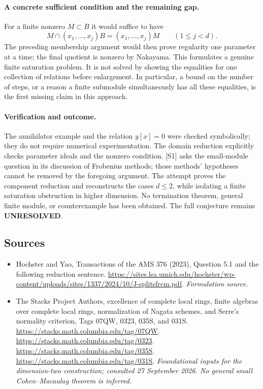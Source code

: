 \documentclass[11pt]{article}
\begin{document}
\paragraph{A concrete sufficient condition and the remaining gap.}
For a finite nonzero $M\subset B$ it would suffice to have
\[
 M\cap(x_1,\ldots,x_j)B=(x_1,\ldots,x_j)M
 \qquad(1\le j<d).
\]
The preceding membership argument would then prove regularity one
parameter at a time; the final quotient is nonzero by Nakayama. This
formulates a genuine finite saturation problem. It is not solved by
showing the equalities for one collection of relations before enlargement.
In particular, a bound on the number of steps, or a reason a finite
submodule simultaneously has all these equalities, is the first missing
claim in this approach.

\paragraph{Verification and outcome.}
The annihilator example and the relation $y[x]=0$ were checked
symbolically; they do not require numerical experimentation. The domain
reduction explicitly checks parameter ideals and the nonzero condition.
[S1] asks the small-module question in its discussion of Frobenius
methods; those methods' hypotheses cannot be removed by the foregoing
argument. The attempt proves the component reduction and reconstructs
the cases $d\le2$, while isolating a finite saturation obstruction in
higher dimension. No termination theorem, general finite module, or
counterexample has been obtained. The full conjecture remains
\textbf{UNRESOLVED}.

\subsection{Sources}
\begin{itemize}
\item[S1]Hochster and Yao, Transactions of the AMS 376 (2023), Question 5.1 and the following reduction sentence.
\url{https://sites.lsa.umich.edu/hochster/wp-content/uploads/sites/1337/2024/10/J-splitsfrcm.pdf}.
\textit{Formulation source.}
\item[E1]The Stacks Project Authors, excellence of complete local rings,
finite algebras over complete local rings, normalization of Nagata schemes,
and Serre's normality criterion, Tags 07QW, 0323, 035S, and 031S.
\url{https://stacks.math.columbia.edu/tag/07QW}.
\url{https://stacks.math.columbia.edu/tag/0323}.
\url{https://stacks.math.columbia.edu/tag/035S}.
\url{https://stacks.math.columbia.edu/tag/031S}.
\textit{Foundational inputs for the dimension-two construction; consulted
27 September 2026. No general small Cohen--Macaulay theorem is inferred.}

\end{itemize}
\end{document}
